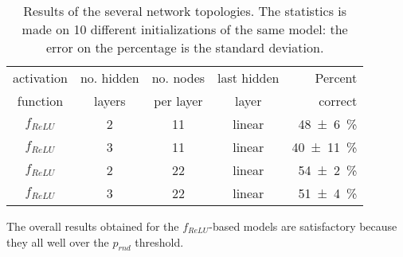\begin{table}[htbp]
	\centering
	\begin{tabular}{c c c c r}
	\toprule
	activation	& no. hidden 	& no. nodes	& last hidden	& Percent \\
	function		& layers 			& per layer	& layer				& correct \\
	\midrule
	$f_{ReLU}$ 			& 2 & 11 & linear & \SI{48 +- 6}{\percent} \\
	$f_{ReLU}$ 			& 3 & 11 & linear & \SI{40 +- 11}{\percent} \\
	$f_{ReLU}$ 			& 2 & 22 & linear & \SI{54 +- 2}{\percent} \\
	$f_{ReLU}$ 			& 3 & 22 & linear & \SI{51 +- 4}{\percent} \\
	\bottomrule
	\end{tabular}
	\caption{Results of the several network topologies.
	The statistics is made on \num{10} different initializations of the same model: the error on the percentage is the standard deviation.
	}
	\label{tab:PyResults}
\end{table}

The overall results obtained for the $f_{ReLU}$-based models are satisfactory because they all well over the $p_{rnd}$ threshold.

